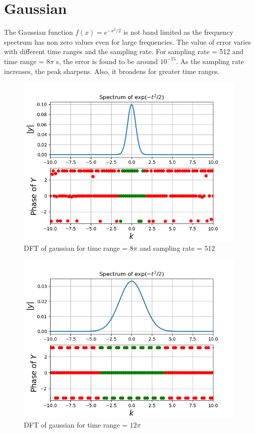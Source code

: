 \documentclass[11pt, a4paper]{article}
\begin{document}
\section{Gaussian}
The Gaussian function $f(x) = e^{-x^2/2}$ is not band limited as the frequency spectrum has non zero values even for large frequencies.
The value of error varies with different time ranges and the sampling rate. For sampling rate = 512 and time range = $8\pi$ s, the error is found to be around $10^{-15}$.
As the sampling rate increases, the peak sharpens. Also, it broadens for greater time ranges.
\begin{figure}[!tbh]
   	\centering
   	\includegraphics[scale=0.5]{fig6.png}  %
   	\caption{DFT of gaussian for time range = $8\pi$ and sampling rate = 512}
   	\label{fig:sample}
   \end{figure} 


\begin{figure}[!tbh]
   	\centering
   	\includegraphics[scale=0.5]{fig7.png}  %
   	\caption{DFT of gaussian for time range = $12\pi$}
   	\label{fig:sample}
   \end{figure}
   
\end{document}

